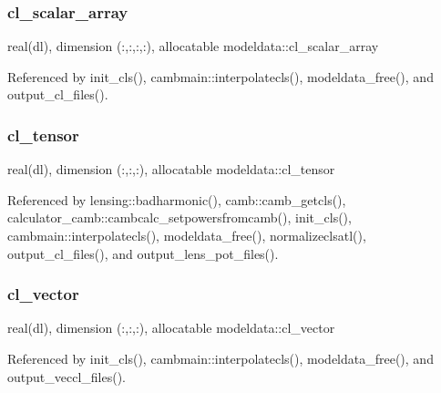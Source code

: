 \mbox{\label{namespacemodeldata_a24816a1c9914f5b5567b61ed37aa320b}} 
\subsubsection{\texorpdfstring{cl\+\_\+scalar\+\_\+array}{cl\_scalar\_array}}
{\footnotesize\ttfamily real(dl), dimension (\+:,\+:,\+:,\+:), allocatable modeldata\+::cl\+\_\+scalar\+\_\+array}



Referenced by init\+\_\+cls(), cambmain\+::interpolatecls(), modeldata\+\_\+free(), and output\+\_\+cl\+\_\+files().

\mbox{\label{namespacemodeldata_a3108cab8cb9fec5823d887825efd266d}} 
\subsubsection{\texorpdfstring{cl\+\_\+tensor}{cl\_tensor}}
{\footnotesize\ttfamily real(dl), dimension (\+:,\+:,\+:), allocatable modeldata\+::cl\+\_\+tensor}



Referenced by lensing\+::badharmonic(), camb\+::camb\+\_\+getcls(), calculator\+\_\+camb\+::cambcalc\+\_\+setpowersfromcamb(), init\+\_\+cls(), cambmain\+::interpolatecls(), modeldata\+\_\+free(), normalizeclsatl(), output\+\_\+cl\+\_\+files(), and output\+\_\+lens\+\_\+pot\+\_\+files().

\mbox{\label{namespacemodeldata_ab8016bbfb187a558b12d8a9c17f6b85c}} 
\subsubsection{\texorpdfstring{cl\+\_\+vector}{cl\_vector}}
{\footnotesize\ttfamily real(dl), dimension (\+:,\+:,\+:), allocatable modeldata\+::cl\+\_\+vector}



Referenced by init\+\_\+cls(), cambmain\+::interpolatecls(), modeldata\+\_\+free(), and output\+\_\+veccl\+\_\+files().

